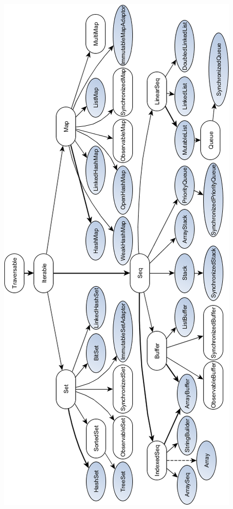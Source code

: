 \documentclass[a4paper,twoside,10pt,landscape]{article}
\begin{document}
\begin{multicols}{3}
\begin{center}
    \includegraphics[scale=.67]{scala-collection-mutable.png}
    \label{fig:scala-collection-mutable}
\end{center}



\end{multicols}
\end{document}
